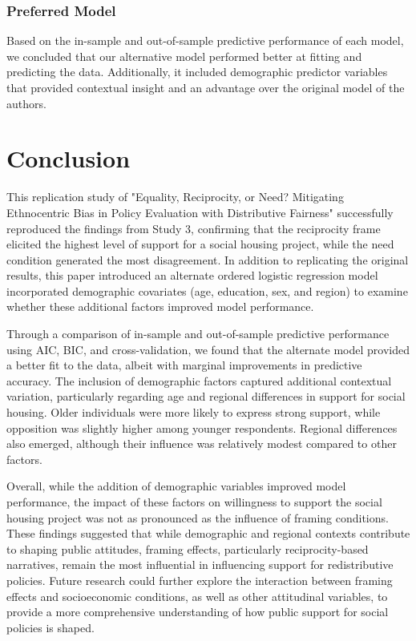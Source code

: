 \documentclass[titlepage]{article}
\begin{document}
\subsubsection{Preferred Model}
Based on the in-sample and out-of-sample predictive performance of each model, we concluded that our alternative model performed better at fitting and predicting the data. Additionally, it included demographic predictor variables that provided contextual insight and an advantage over the original model of the authors.

\section{Conclusion}
This replication study of "Equality, Reciprocity, or Need? Mitigating Ethnocentric Bias in Policy Evaluation with Distributive Fairness" successfully reproduced the findings from Study 3, confirming that the reciprocity frame elicited the highest level of support for a social housing project, while the need condition generated the most disagreement. In addition to replicating the original results, this paper introduced an alternate ordered logistic regression model incorporated demographic covariates (age, education, sex, and region) to examine whether these additional factors improved model performance.

\justify
Through a comparison of in-sample and out-of-sample predictive performance using AIC, BIC, and cross-validation, we found that the alternate model provided a better fit to the data, albeit with marginal improvements in predictive accuracy. The inclusion of demographic factors captured additional contextual variation, particularly regarding age and regional differences in support for social housing. Older individuals were more likely to express strong support, while opposition was slightly higher among younger respondents. Regional differences also emerged, although their influence was relatively modest compared to other factors.

\justify
Overall, while the addition of demographic variables improved model performance, the impact of these factors on willingness to support the social housing project was not as pronounced as the influence of framing conditions. These findings suggested that while demographic and regional contexts contribute to shaping public attitudes, framing effects, particularly reciprocity-based narratives, remain the most influential in influencing support for redistributive policies. Future research could further explore the interaction between framing effects and socioeconomic conditions, as well as other attitudinal variables, to provide a more comprehensive understanding of how public support for social policies is shaped.
\end{document}
